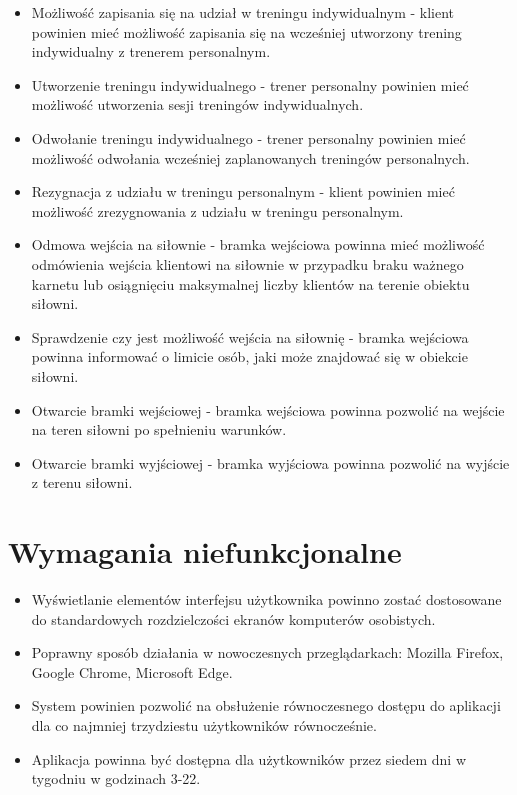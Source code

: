 \documentclass[a4paper,twoside,12pt]{book}
\begin{document}
{\begin{itemize}
			\item Możliwość zapisania się na udział w treningu indywidualnym - klient powinien mieć możliwość zapisania się na wcześniej utworzony trening indywidualny z trenerem personalnym.
			\item Utworzenie treningu indywidualnego - trener personalny powinien mieć możliwość utworzenia sesji treningów indywidualnych.
			\item Odwołanie treningu indywidualnego - trener personalny powinien mieć możliwość odwołania wcześniej zaplanowanych treningów personalnych.
			\item Rezygnacja z udziału w treningu personalnym - klient powinien mieć możliwość zrezygnowania z udziału w treningu personalnym.
			\item Odmowa wejścia na siłownie - bramka wejściowa powinna mieć możliwość odmówienia wejścia klientowi na siłownie w przypadku braku ważnego karnetu lub osiągnięciu maksymalnej liczby klientów na terenie obiektu siłowni.
			\item Sprawdzenie czy jest możliwość wejścia na siłownię - bramka wejściowa powinna informować o limicie osób, jaki może znajdować się w obiekcie siłowni.
			\item Otwarcie bramki wejściowej - bramka wejściowa powinna pozwolić na wejście na teren siłowni po spełnieniu warunków.
			\item Otwarcie bramki wyjściowej - bramka wyjściowa powinna pozwolić na wyjście z terenu siłowni.
		\end{itemize}
			
	\section {Wymagania niefunkcjonalne}
		\begin {itemize}
			\item Wyświetlanie elementów interfejsu użytkownika powinno zostać dostosowane do standardowych rozdzielczości ekranów komputerów osobistych.
			\item Poprawny sposób działania w nowoczesnych przeglądarkach: Mozilla Firefox, Google Chrome, Microsoft Edge.
			\item System powinien pozwolić na obsłużenie równoczesnego dostępu do aplikacji dla co najmniej trzydziestu użytkowników równocześnie.
			\item Aplikacja powinna być dostępna dla użytkowników przez siedem dni w tygodniu w godzinach 3-22.
		\end{itemize}
	
}
\end{document}
